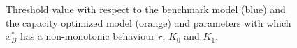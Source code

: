 

\begin{figure}[!htb]
	\begin{subfigmatrix}{3}
	\end{subfigmatrix}
	\caption{Threshold value with respect to the benchmark model (blue) and the capacity optimized model (orange) and parameters with which  $x^*_B$ has a non-monotonic behaviour $r$, $K_0$ and $K_1$.}
	\label{fig:2_x1}
\end{figure}


